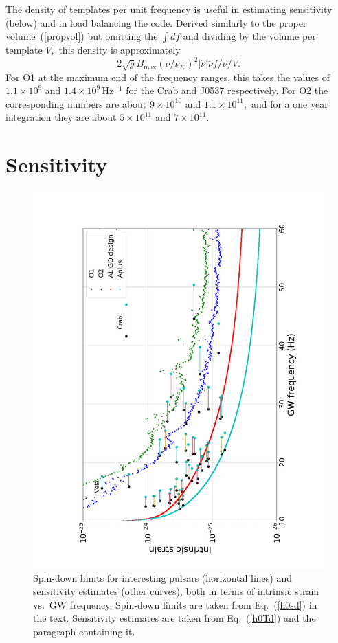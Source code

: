\documentclass{ttuthes2007}
\begin{document}
The density of templates per unit frequency is useful in estimating
sensitivity (below) and in load balancing the code.
Derived similarly to the proper volume~(\ref{propvol}) but omitting the $\int
df$ and dividing by the volume per template $V,$ this density is approximately
\begin{equation}
2\sqrt{g} B_{\max} \left( \nu/\nu_K \right)^2 \left| \dot\nu \right| \ddot\nu
f/\nu / V.
\end{equation}
For \ac{O1} at the maximum end of the frequency ranges, this takes the values of
$1.1\times10^9$ and $1.4\times10^9$\,Hz$^{-1}$ for the Crab and J0537
respectively.
For \ac{O2} the corresponding numbers are about $9\times10^{10}$ and
$1.1\times10^{11},$ and for a one year integration they are about
$5\times10^{11}$ and $7\times10^{11}.$

\section{Sensitivity}

\begin{figure}
\includegraphics[angle=270,width=\linewidth]{figure/rmeth1}
\caption{
\label{fig1}
Spin-down limits for interesting pulsars (horizontal lines) and sensitivity
estimates (other curves), both in terms of intrinsic strain vs.\ \ac{GW}
frequency.
Spin-down limits are taken from Eq.~(\ref{h0sd}) in the text.
Sensitivity estimates are taken from Eq.~(\ref{h0Td}) and the paragraph
containing it.
}
\end{figure}
\end{document}
